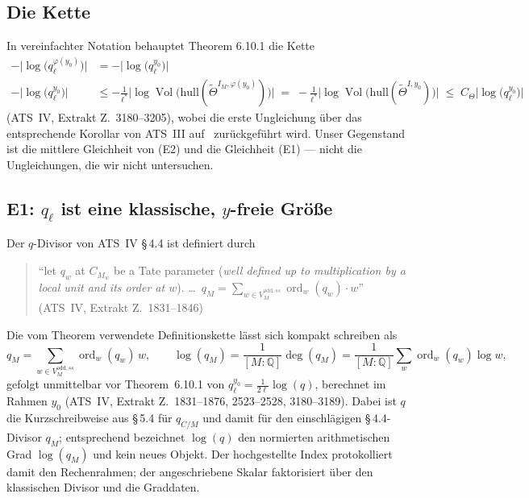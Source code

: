 \documentclass[11pt,a4paper]{article}
\theoremstyle{definition}
\theoremstyle{plain}
\theoremstyle{definition}
\newcommand{\ordd}{\operatorname{ord}}
\newcommand{\Vol}{\operatorname{Vol}}
\newcommand{\Thet}{\widetilde{\Theta}}
\newcommand{\anchor}[2]{(#1, Extrakt Z.~#2)}
\begin{document}
\subsection{Die Kette}

In vereinfachter Notation behauptet Theorem 6.10.1 die Kette
\begin{align}
  -\bigl|\log\bigl(q_\ell^{\varphi(y_0)}\bigr)\bigr| &= -\bigl|\log\bigl(q_\ell^{y_0}\bigr)\bigr|
  \tag{E1}\\[2pt]
  -\bigl|\log\bigl(q_\ell^{y_0}\bigr)\bigr|
  &\le -\tfrac{1}{\ell^*}\bigl|\log \Vol\bigl(\mathrm{hull}(\Thet^{I_M,\varphi(y_0)})\bigr)\bigr|
  \;=\; -\tfrac{1}{\ell^*}\bigl|\log \Vol\bigl(\mathrm{hull}(\Thet^{I,y_0})\bigr)\bigr|
  \;\le\; C_\Theta \bigl|\log\bigl(q_\ell^{y_0}\bigr)\bigr|
  \tag{E2}
\end{align}
\anchor{ATS~IV}{3180--3205}, wobei die erste Ungleichung über das entsprechende
Korollar von ATS~III auf~\cite{Mochizuki2021c} zurückgeführt wird. Unser Gegenstand
ist die mittlere Gleichheit von (E2) und die Gleichheit (E1) --- nicht die
Ungleichungen, die wir nicht untersuchen.

\subsection{E1: \texorpdfstring{$q_\ell$}{q\_l} ist eine klassische, \texorpdfstring{$y$}{y}-freie Größe}

Der $q$-Divisor von ATS~IV \S\,4.4 ist definiert durch

\begin{quote}\small
``let $q_w$ at $C_{M_w}$ be a Tate parameter (\emph{well defined up to
multiplication by a local unit and its order at $w$}). \ldots\
$q_M = \sum_{w \in V^{\mathrm{odd},ss}_M} \ordd_w(q_w) \cdot w$''
\hfill\anchor{ATS~IV}{1831--1846}
\end{quote}

Die vom Theorem verwendete Definitionskette lässt sich kompakt schreiben als
\[
 q_M=\sum_{w\in V_M^{\mathrm{odd},ss}}\ordd_w(q_w)\,w,
 \qquad
 \log(q_M)=\frac{1}{[M:\mathbb{Q}]}\deg(q_M)
 =\frac{1}{[M:\mathbb{Q}]}
   \sum_w \ordd_w(q_w)\log w,
\]
gefolgt unmittelbar vor Theorem~6.10.1 von
$q_\ell^{y_0}=\tfrac{1}{2\ell}\log(q)$, berechnet im Rahmen $y_0$
\anchor{ATS~IV}{1831--1876, 2523--2528, 3180--3189}. Dabei ist $q$ die
Kurzschreibweise aus \S\,5.4 für $q_{C/M}$ und damit für den einschlägigen
\S\,4.4-Divisor $q_M$; entsprechend bezeichnet $\log(q)$ den normierten
arithmetischen Grad $\log(q_M)$ und kein neues Objekt. Der hochgestellte Index
protokolliert damit den Rechenrahmen; der angeschriebene Skalar faktorisiert über den klassischen
Divisor und die Graddaten.
\end{document}
